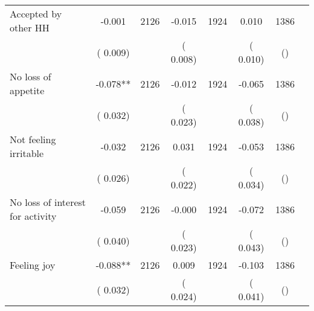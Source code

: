 \begin{tabular}{l*{6}{c}}
Accepted by other HH        &             -0.001      &       2126       &             -0.015      &       1924       &              0.010      &       1386  &  &              \\
                       &       (       0.009)            &                               &       (       0.008)            &                               &       (       0.010)            &       () &                  \\
No loss of appetite        &             -0.078**      &       2126       &             -0.012      &       1924       &             -0.065      &       1386  &  &              \\
                       &       (       0.032)            &                               &       (       0.023)            &                               &       (       0.038)            &       () &                  \\
Not feeling irritable        &             -0.032      &       2126       &              0.031      &       1924       &             -0.053      &       1386  &  &              \\
                       &       (       0.026)            &                               &       (       0.022)            &                               &       (       0.034)            &       () &                  \\
No loss of interest for activity        &             -0.059      &       2126       &             -0.000      &       1924       &             -0.072      &       1386  &  &              \\
                       &       (       0.040)            &                               &       (       0.023)            &                               &       (       0.043)            &       () &                  \\
Feeling joy        &             -0.088**      &       2126       &              0.009      &       1924       &             -0.103      &       1386  &  &              \\
                       &       (       0.032)            &                               &       (       0.024)            &                               &       (       0.041)            &       () &                  \\
\hline \end{tabular}